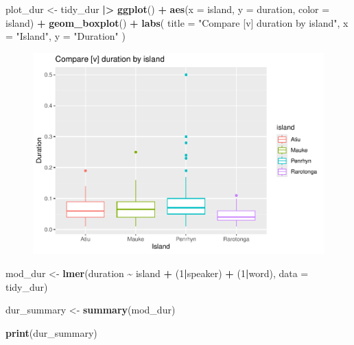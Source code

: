 \documentclass[
  ,man,floatsintext]{apa6}
\newenvironment{Shaded}{\begin{snugshade}}{\end{snugshade}}
\newcommand{\AttributeTok}[1]{\textcolor[rgb]{0.13,0.29,0.53}{#1}}
\newcommand{\DecValTok}[1]{\textcolor[rgb]{0.00,0.00,0.81}{#1}}
\newcommand{\FunctionTok}[1]{\textcolor[rgb]{0.13,0.29,0.53}{\textbf{#1}}}
\newcommand{\NormalTok}[1]{#1}
\newcommand{\OtherTok}[1]{\textcolor[rgb]{0.56,0.35,0.01}{#1}}
\newcommand{\SpecialCharTok}[1]{\textcolor[rgb]{0.81,0.36,0.00}{\textbf{#1}}}
\newcommand{\StringTok}[1]{\textcolor[rgb]{0.31,0.60,0.02}{#1}}
\begin{document}
\begin{Shaded}
\begin{Highlighting}[]
\NormalTok{plot\_dur }\OtherTok{\textless{}{-}}\NormalTok{ tidy\_dur }\SpecialCharTok{|\textgreater{}}
  \FunctionTok{ggplot}\NormalTok{() }\SpecialCharTok{+}
  \FunctionTok{aes}\NormalTok{(}\AttributeTok{x =}\NormalTok{ island, }\AttributeTok{y =}\NormalTok{ duration, }\AttributeTok{color =}\NormalTok{ island) }\SpecialCharTok{+}
  \FunctionTok{geom\_boxplot}\NormalTok{() }\SpecialCharTok{+}
  \FunctionTok{labs}\NormalTok{(}
    \AttributeTok{title =} \StringTok{"Compare [v] duration by island"}\NormalTok{,}
    \AttributeTok{x =} \StringTok{"Island"}\NormalTok{,}
    \AttributeTok{y =} \StringTok{"Duration"}
\NormalTok{  )}
\end{Highlighting}
\end{Shaded}

\begin{figure}
\includegraphics[width=0.75\linewidth]{D2_CIM_files/figure-latex/print-duration-plot-1} \caption{ }\label{fig:print-duration-plot}
\end{figure}

\begin{Shaded}
\begin{Highlighting}[]
\NormalTok{mod\_dur }\OtherTok{\textless{}{-}} \FunctionTok{lmer}\NormalTok{(duration }\SpecialCharTok{\textasciitilde{}}\NormalTok{ island }\SpecialCharTok{+}\NormalTok{ (}\DecValTok{1}\SpecialCharTok{|}\NormalTok{speaker) }\SpecialCharTok{+}\NormalTok{ (}\DecValTok{1}\SpecialCharTok{|}\NormalTok{word), }\AttributeTok{data =}\NormalTok{ tidy\_dur)}

\NormalTok{dur\_summary }\OtherTok{\textless{}{-}} \FunctionTok{summary}\NormalTok{(mod\_dur)}

\FunctionTok{print}\NormalTok{(dur\_summary)}
\end{Highlighting}
\end{Shaded}
\end{document}
